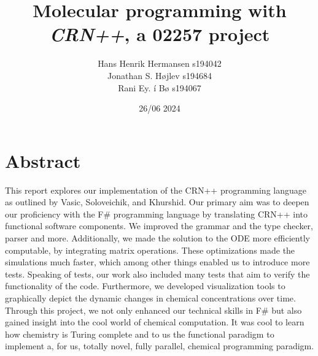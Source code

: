 \documentclass[11pt,a4paper]{article}
\title{Molecular programming with \textit{CRN++}, a 02257 project}
\author{
    Hans Henrik Hermansen s194042\\
    Jonathan S. Højlev s194684\\
    Rani Ey. í Bø s194067}
\date{26/06 2024}
\begin{document}

\maketitle
\section{Abstract}
This report explores our implementation of the CRN++ programming language as outlined by Vasic, Soloveichik, and Khurshid. Our primary aim was to deepen our proficiency with the F\# programming language by translating CRN++ into functional software components. We improved the grammar and the type checker, parser and more. Additionally, we made the solution to the ODE more efficiently computable, by integrating matrix operations. These optimizations made the simulations much faster, which among other things enabled us to introduce more tests. Speaking of tests, our work also included many tests that aim to verify the functionality of the code. Furthermore, we developed visualization tools to graphically depict the dynamic changes in chemical concentrations over time.\\

Through this project, we not only enhanced our technical skills in F\# but also gained insight into the cool world of chemical computation. It was cool to learn how chemistry is Turing complete and to us the functional paradigm to implement a, for us, totally novel, fully parallel, chemical programming paradigm.




\newpage







\newpage

\end{document}
